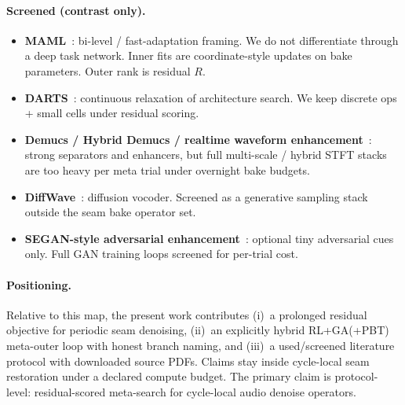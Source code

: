 \paragraph{Screened (contrast only).}
\begin{itemize}
  \item \textbf{MAML}~\cite{finn2017}: bi-level / fast-adaptation framing. We do not differentiate through a deep task network. Inner fits are coordinate-style updates on bake parameters. Outer rank is residual $R$.
  \item \textbf{DARTS}~\cite{liu2019}: continuous relaxation of architecture search. We keep discrete ops + small cells under residual scoring.
  \item \textbf{Demucs / Hybrid Demucs / realtime waveform enhancement}~\cite{dfossez2019,dfossez2021,dfossez2020}: strong separators and enhancers, but full multi-scale / hybrid STFT stacks are too heavy per meta trial under overnight bake budgets.
  \item \textbf{DiffWave}~\cite{kong2021}: diffusion vocoder. Screened as a generative sampling stack outside the seam bake operator set.
  \item \textbf{SEGAN-style adversarial enhancement}~\cite{pascual2017}: optional tiny adversarial cues only. Full GAN training loops screened for per-trial cost.
\end{itemize}

\paragraph{Positioning.}
Relative to this map, the present work contributes (i)~a prolonged residual objective for periodic seam denoising, (ii)~an explicitly hybrid RL+GA(+PBT) meta-outer loop with honest branch naming, and (iii)~a used/screened literature protocol with downloaded source PDFs.
Claims stay inside cycle-local seam restoration under a declared compute budget.
The primary claim is protocol-level: residual-scored meta-search for cycle-local audio denoise operators.

